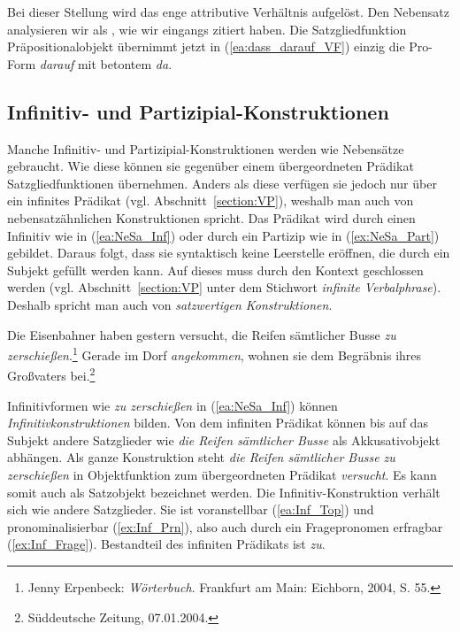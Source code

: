Bei dieser Stellung wird das enge attributive Verhältnis aufgelöst. Den Nebensatz analysieren wir als , wie wir eingangs \citet[1488]{ZifHoffStr1997} zitiert haben. Die Satzgliedfunktion Präpositionalobjekt übernimmt jetzt in (\ref{ea:dass_darauf_VF}) einzig die Pro-Form \textit{darauf} mit betontem \textit{da}. 


\subsection{Infinitiv- und Partizipial-Konstruktionen}\label{subsection:NebensatzähnlicheK}

Manche Infinitiv- und Partizipial-Konstruktionen werden wie Nebensätze gebraucht. Wie diese können sie gegenüber einem übergeordneten Prädikat Satzgliedfunktionen übernehmen. Anders als diese verfügen sie jedoch nur über ein infinites Prädikat (vgl. Abschnitt~\ref{section:VP}), weshalb man auch von nebensatzähnlichen Konstruktionen spricht. Das Prädikat wird durch einen Infinitiv wie in (\ref{ea:NeSa_Inf}) oder durch ein Partizip wie in (\ref{ex:NeSa_Part}) gebildet. Daraus folgt, dass sie syntaktisch keine Leerstelle eröffnen, die durch ein Subjekt gefüllt werden kann. Auf dieses muss durch den Kontext geschlossen werden (vgl. Abschnitt~\ref{section:VP} unter dem Stichwort \textit{infinite Verbalphrase}). Deshalb spricht man auch von \textit{satzwertigen Konstruktionen}. 

\ea \label{ea:nebensatzähnlich}
\ea \label{ea:NeSa_Inf} Die Eisenbahner haben gestern versucht, die Reifen sämtlicher Busse \textit{zu zerschießen}.\footnote{Jenny Erpenbeck: \textit{Wörterbuch}. Frankfurt am Main: Eichborn, 2004, S. 55.}
\ex \label{ex:NeSa_Part} Gerade im Dorf \textit{angekommen}, wohnen sie dem Begräbnis ihres Großvaters bei.\footnote{Süddeutsche Zeitung, 07.01.2004.}
\z 
\z 

Infinitivformen wie \textit{zu zerschießen} in (\ref{ea:NeSa_Inf}) können   \textit{Infinitivkonstruktionen} bilden. Von dem infiniten Prädikat können bis auf das Subjekt andere Satzglieder wie \textit{die Reifen sämtlicher Busse} als Akkusativobjekt abhängen. Als ganze Konstruktion steht \textit{die Reifen sämtlicher Busse zu zerschießen} in Objektfunktion zum übergeordneten Prädikat \textit{versucht}. Es kann somit auch als Satzobjekt bezeichnet werden. Die Infinitiv-Konstruktion verhält sich wie andere Satzglieder. Sie ist voranstellbar (\ref{ea:Inf_Top}) und pronominalisierbar (\ref{ex:Inf_Prn}), also auch durch ein Fragepronomen erfragbar (\ref{ex:Inf_Frage}). Bestandteil des infiniten Prädikats ist \textit{zu}. 

